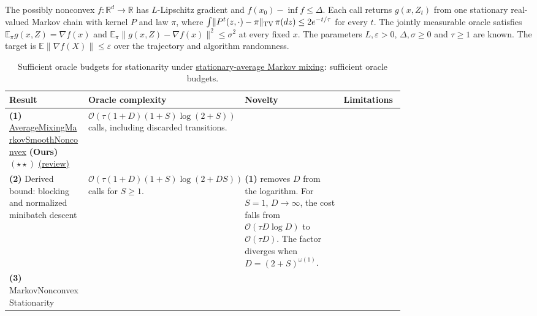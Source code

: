 \begin{table}[tp]
\centering
\caption{Sufficient oracle budgets for stationarity under \href{https://github.com/k3nfalt/longtails/blob/main/LongTails/Setups/AverageMixingMarkovSmoothNonconvex.lean}{stationary-average Markov mixing}: sufficient oracle budgets.}\label{tab:AverageMixingMarkovSmoothNonconvex}
\parbox{\linewidth}{\footnotesize
The possibly nonconvex $f:\mathbb R^d\to\mathbb R$ has $L$-Lipschitz gradient and $f(x_0)-\inf f\le\Delta$. Each call returns $g(x,Z_t)$ from one stationary real-valued Markov chain with kernel $P$ and law $\pi$, where $\int\!\|P^t(z,\cdot)-\pi\|_{\rm TV}\,\pi(dz)\le 2e^{-t/\tau}$ for every $t$. The jointly measurable oracle satisfies $\mathbb E_\pi g(x,Z)=\nabla f(x)$ and $\mathbb E_\pi\|g(x,Z)-\nabla f(x)\|^2\le\sigma^2$ at every fixed $x$. The parameters $L,\varepsilon>0$, $\Delta,\sigma\ge0$ and $\tau\ge1$ are known. The target is $\mathbb E\|\nabla f(X)\|\le\varepsilon$ over the trajectory and algorithm randomness.}\par\smallskip
\begin{threeparttable}
\footnotesize
\setlength{\tabcolsep}{4pt}\renewcommand{\arraystretch}{1.25}
\begin{tabularx}{\linewidth}{@{}>{\raggedright\arraybackslash}p{0.20\linewidth}>{\raggedright\arraybackslash}p{0.30\linewidth}>{\raggedright\arraybackslash}p{0.25\linewidth}>{\raggedright\arraybackslash}X@{}}
\toprule
\textbf{Result} & \textbf{Oracle complexity} & \textbf{Novelty} & \textbf{Limitations} \\
\midrule
\textbf{(1)} \href{https://github.com/k3nfalt/longtails/blob/main/LongTails/Theorems/AverageMixingMarkovSmoothNonconvex.lean}{Average\allowbreak Mixing\allowbreak Markov\allowbreak Smooth\allowbreak Nonconvex} \textbf{(Ours)} $(\star\star)$ \href{https://github.com/k3nfalt/longtails/blob/main/scripts/reviews/AverageMixingMarkovSmoothNonconvex.md}{(review)}
& $\mathcal{O}\!\left(\tau(1+D)(1+S)\log(2+S)\right)$ calls, including discarded transitions. & & \\
\midrule[1.2pt]
\textbf{(2)} Derived bound: blocking \citep[Lem.~4.1]{ammsYu1994} and normalized minibatch descent \citep[Lem.~2]{shncscCutkosky2020}
& $\mathcal{O}\!\left(\tau(1+D)(1+S)\log(2+DS)\right)$ calls for $S\ge1$.
& \textbf{(1)} removes $D$ from the logarithm. For $S=1$, $D\to\infty$, the cost falls from $\mathcal{O}(\tau D\log D)$ to $\mathcal{O}(\tau D)$. The factor diverges when $D=(2+S)^{\omega(1)}$. & \\
\midrule
\textbf{(3)} Markov\allowbreak Nonconvex\allowbreak Stationarity \citep{ammsLongTailsMarkov}

\end{tabularx}
\end{threeparttable}
\end{table}

